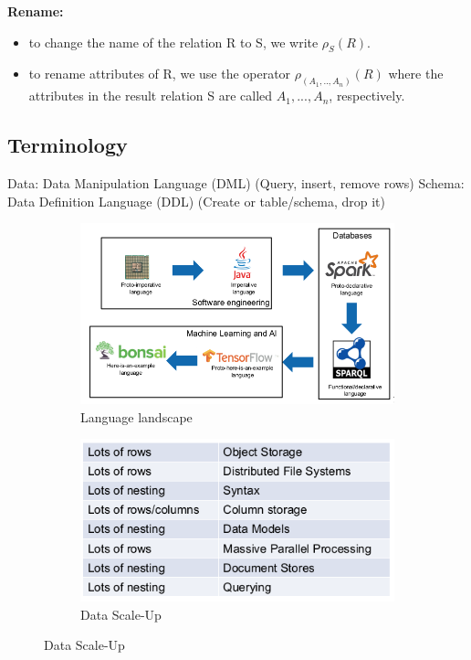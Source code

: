\documentclass[11pt,oneside,a4paper]{article}
\begin{document}
\textbf{Rename:} 

\vspace{-\topsep}
\begin{itemize}
	\setlength{\itemsep}{0pt}
	\setlength{\parskip}{0pt}
	\item to change the name of the relation R to S, we write $\rho_S(R)$. 
	\item to rename attributes of R, we use the operator $\rho_{(A_1,..,A_n)}(R)$ where the attributes in the result relation S are called $A_1,...,A_n$, respectively.
\end{itemize}
\vspace{-\topsep}

\newpage

\subsection{Terminology}

Data: Data Manipulation Language (DML) (Query, insert, remove rows)
Schema: Data Definition Language (DDL) (Create or table/schema, drop it)
\vspace{-\topsep}
\begin{figure}[hb!]
	\centering
	\begin{subfigure}[t]{.5\textwidth}
		\centering
		\includegraphics[width=0.8\linewidth]{figures/language_landscape}
		\caption{Language landscape}
		\label{fig:languagelandscape}
	\end{subfigure}%
	\begin{subfigure}[t]{.5\textwidth}
		\centering
		\includegraphics[width=0.8\linewidth]{figures/scaling_up_overview}
		\caption{Data Scale-Up}
		\label{fig:scalingupoverview}
	\end{subfigure}
\end{figure}
\end{document}
